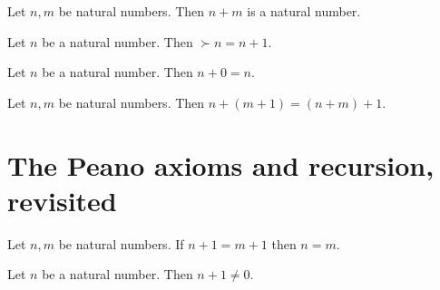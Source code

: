 \documentclass[../arithmetic.tex]{subfiles}
\begin{document}
  \begin{forthel}
    \begin{lemma}
      Let $n, m$ be natural numbers.
      Then $n \plus m$ is a natural number.
    \end{lemma}
  \end{forthel}

  \begin{forthel}
    \begin{lemma}
      Let $n$ be a natural number.
      Then $\succ{n} = n \plus 1$.
    \end{lemma}
  \end{forthel}

  \begin{forthel}
    \begin{lemma}
      Let $n$ be a natural number.
      Then $n \plus 0 = n$.
    \end{lemma}
  \end{forthel}

  \begin{forthel}
    \begin{lemma}
      Let $n, m$ be natural numbers.
      Then $n \plus (m \plus 1) = (n \plus m) \plus 1$.
    \end{lemma}
  \end{forthel}


  \section{The Peano axioms and recursion, revisited}

  \begin{forthel}
    \begin{proposition}
      Let $n, m$ be natural numbers.
      If $n \plus 1 = m \plus 1$ then $n = m$.
    \end{proposition}
  \end{forthel}

  \begin{forthel}
    \begin{proposition}
      Let $n$ be a natural number.
      Then $n \plus 1 \neq 0$.
    \end{proposition}
  \end{forthel}
\end{document}

